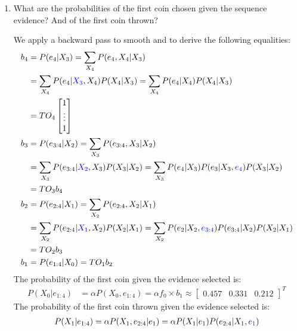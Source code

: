 \documentclass[9pt,a4paper]{extarticle}
\newenvironment{solution}
    {%
    \color{red}
    }
    { 
    \color{black}
    }
\begin{document}
\begin{enumerate}
\begin{solution}
       \end{solution}
       \item What are the probabilities of the first coin chosen given the sequence evidence? And of the first coin thrown?
       \begin{solution}
       We apply a backward pass to smooth and to derive the following equalities:
       \begin{align}
           b_{4} &= P(e_4|X_3) = \sum_{X_4} P(e_4, X_4|X_3)\nonumber\\
           &= \sum_{X_4} P(e_4|\textcolor{blue}{X_3}, X_4)P(X_4| X_3) = \sum_{X_4} P(e_4| X_4)P(X_4| X_3)\nonumber\\
           &=TO_4\begin{bmatrix}1 \\ \vdots \\ 1\end{bmatrix}\\
           b_{3} &= P(e_{3:4}|X_2) = \sum_{X_3}P(e_{3:4}, X_3|X_2)\nonumber\\
           &= \sum_{X_3}P(e_{3:4}|\textcolor{blue}{X_2}, X_3)P(X_3|X_2) =
           \sum_{X_3}P(e_{4}| X_3)P(e_{3}| X_3, \textcolor{blue}{e_4})P(X_3|X_2)\nonumber\\
           &= TO_3b_{4}\\
           b_{2} &= P(e_{2:4}|X_1) = \sum_{X_2} P(e_{2:4}, X_2|X_1)\nonumber\\
           &= \sum_{X_2} P(e_{2:4}|\textcolor{blue}{X_1}, X_2)P(X_2|X_1) = \sum_{X_2} P(e_2|X_2, \textcolor{blue}{e_{3:4}})P(e_{3:4}|X_2)P(X_2|X_1)\nonumber\\
           &= TO_2b_{3}\\
           b_{1} &= P(e_{1:4}|X_0) = T O_1 b_2
           \end{align}
           The probability of the first coin given the evidence selected is:
           \begin{align}
           P(X_0|e_{1:4}) &= \alpha P(X_0, e_{1:4}) = \alpha f_0 \times b_1 \approx 
           \begin{bmatrix}
           0.457 & 0.331 & 0.212
           \end{bmatrix}^T
           \end{align}
           The probability of the first coin thrown given the evidence selected is:
           \begin{align}
           P(X_1|e_{1:4}) &= \alpha P(X_1, e_{2:4}|e_1) = \alpha P(X_1| e_1)P(e_{2:4}|X_1, \textcolor{blue}{e_1}) \nonumber\\

\end{align}
\end{solution}
\end{enumerate}
\end{document}
